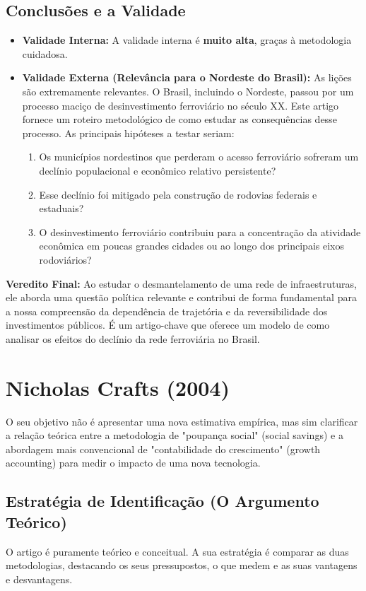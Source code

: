 \documentclass[12pt, a4paper]{article}
\begin{document}
\subsection{Conclusões e a Validade}
\begin{itemize}
    \item \textbf{Validade Interna:} A validade interna é \textbf{muito alta}, graças à metodologia cuidadosa.
    \item \textbf{Validade Externa (Relevância para o Nordeste do Brasil):} As lições são extremamente relevantes. O Brasil, incluindo o Nordeste, passou por um processo maciço de desinvestimento ferroviário no século XX. Este artigo fornece um roteiro metodológico de como estudar as consequências desse processo. As principais hipóteses a testar seriam:
        \begin{enumerate}
            \item Os municípios nordestinos que perderam o acesso ferroviário sofreram um declínio populacional e econômico relativo persistente?
            \item Esse declínio foi mitigado pela construção de rodovias federais e estaduais?
            \item O desinvestimento ferroviário contribuiu para a concentração da atividade econômica em poucas grandes cidades ou ao longo dos principais eixos rodoviários?
        \end{enumerate}
\end{itemize}

\noindent\textbf{Veredito Final:} Ao estudar o desmantelamento de uma rede de infraestruturas, ele aborda uma questão política relevante e contribui de forma fundamental para a nossa compreensão da dependência de trajetória e da reversibilidade dos investimentos públicos. É um artigo-chave que oferece um modelo de como analisar os efeitos do declínio da rede ferroviária no Brasil.

\section{Nicholas Crafts (2004)}
O seu objetivo não é apresentar uma nova estimativa empírica, mas sim clarificar a relação teórica entre a metodologia de "poupança social" (social savings) e a abordagem mais convencional de "contabilidade do crescimento" (growth accounting) para medir o impacto de uma nova tecnologia.

\subsection{Estratégia de Identificação (O Argumento Teórico)}
O artigo é puramente teórico e conceitual. A sua estratégia é comparar as duas metodologias, destacando os seus pressupostos, o que medem e as suas vantagens e desvantagens.
\end{document}
